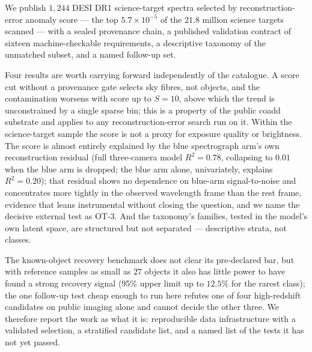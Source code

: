 \documentclass[aps,prd,twocolumn,superscriptaddress,nofootinbib,longbibliography,floatfix]{revtex4-2}
\begin{document}
We publish $1{,}244$ DESI DR1 science-target spectra selected by
reconstruction-error anomaly score --- the top $5.7\times10^{-5}$ of the
$21.8$ million science targets scanned --- with a sealed provenance chain, a
published validation contract of sixteen machine-checkable requirements, a
descriptive taxonomy of the unmatched subset, and a named follow-up set.

Four results are worth carrying forward independently of the catalogue. A
score cut without a provenance gate selects sky fibres, not objects, and the
contamination worsens with score up to $S=10$, above which the trend is
unconstrained by a single sparse bin; this is a property of the public coadd
substrate and applies to any reconstruction-error search run on it. Within
the science-target sample the score is not a proxy for exposure quality or
brightness. The score is almost entirely explained by the blue spectrograph
arm's own reconstruction residual (full three-camera model $R^2=0.78$,
collapsing to $0.01$ when the blue arm is dropped; the blue arm alone,
univariately, explains $R^2=0.20$); that residual shows no dependence on
blue-arm signal-to-noise and concentrates more tightly in the observed
wavelength frame than the rest frame, evidence that leans instrumental
without closing the question, and we name the decisive external test as
OT-3. And the taxonomy's families, tested in the model's own latent
space, are structured but not separated --- descriptive strata, not classes.

The known-object recovery benchmark does not clear its pre-declared bar, but
with reference samples as small as $27$ objects it also has little power to
have found a strong recovery signal (95\% upper limit up to $12.5\%$ for the
rarest class); the one follow-up test cheap enough to run here refutes one of
four high-redshift candidates on public imaging alone and cannot decide the
other three. We therefore report the work as what it is: reproducible data
infrastructure with a validated selection, a stratified candidate list, and a
named list of the tests it has not yet passed.
\end{document}
